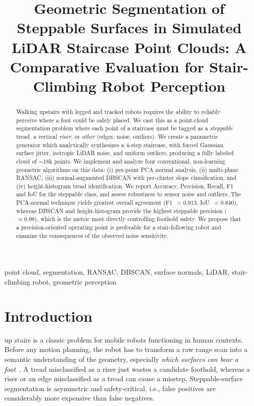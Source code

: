 \documentclass[conference]{IEEEtran}
\begin{document}
\title{Geometric Segmentation of Steppable Surfaces in Simulated LiDAR
Staircase Point Clouds: A Comparative Evaluation for Stair-Climbing Robot
Perception}

\author{
}

\maketitle

\begin{abstract}
Walking upstairs with legged and tracked robots requires the ability to reliably
perceive where a foot could be safely placed. We cast this as a point-cloud
segmentation problem where each point of a staircase must be tagged as a
\emph{steppable} tread, a vertical \emph{riser}, or \emph{other} (edges, noise,
outliers). We create a parametric generator which analytically synthesizes a
4-step staircase, with forced Gaussian surface jitter, isotropic LiDAR noise, and
uniform outliers, producing a fully labeled cloud of $\sim$18k points. We implement
and analyze four conventional, non-learning geometric algorithms on this data:
(i) per-point PCA normal analysis, (ii) multi-plane RANSAC, (iii) normal-augmented
DBSCAN with per-cluster slope classification, and (iv) height-histogram tread
identification. We report Accuracy, Precision, Recall, F1 and IoU for the steppable
class, and assess robustness to sensor noise and outliers. The PCA-normal technique
yields greatest overall agreement (F1~$=0.913$, IoU~$=0.840$), whereas DBSCAN and
height-histogram provide the highest steppable precision ($\approx0.98$), which is
the metric most directly controlling foothold safety. We propose that a
precision-oriented operating point is preferable for a stair-following robot and
examine the consequences of the observed noise sensitivity.
\end{abstract}

\begin{IEEEkeywords}
point cloud, segmentation, RANSAC, DBSCAN, surface normals, LiDAR, stair-climbing
robot, geometric perception
\end{IEEEkeywords}

\section{Introduction}
 up stairs is a classic problem for mobile robots
functioning in human contexts. Before any motion planning, the robot has to
transform a raw range scan into a semantic understanding of the geometry,
especially \emph{which surfaces can bear a foot}~\cite{kanoulas2018footstep}. A
tread misclassified as a riser just wastes a candidate foothold, whereas a riser
or an edge misclassified as a tread can cause a misstep. Steppable-surface
segmentation is asymmetric and safety-critical, i.e., false positives are
considerably more expensive than false negatives.
\end{document}
